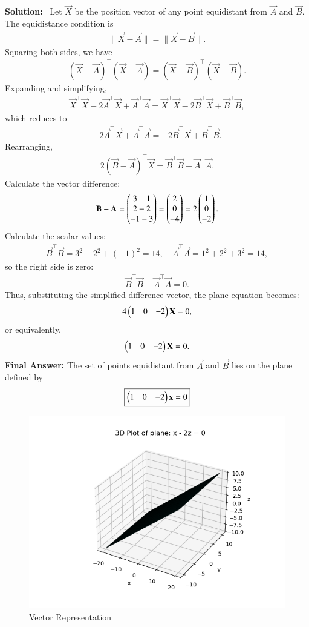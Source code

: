 \documentclass[journal]{IEEEtran}
\begin{document}
\textbf{Solution:} \
Let \(\vec{X}\) be the position vector of any point equidistant from \(\vec{A}\) and \(\vec{B}\).
The equidistance condition is
\begin{align}
\|\vec{X} - \vec{A}\| = \|\vec{X} - \vec{B}\|.
\end{align}
Squaring both sides, we have
\begin{align}
(\vec{X} - \vec{A})^\top (\vec{X} - \vec{A}) = (\vec{X} - \vec{B})^\top (\vec{X} - \vec{B}).
\end{align}
Expanding and simplifying,
\begin{align}
\vec{X}^\top \vec{X} - 2 \vec{A}^\top \vec{X} + \vec{A}^\top \vec{A} = \vec{X}^\top \vec{X} - 2 \vec{B}^\top \vec{X} + \vec{B}^\top \vec{B},
\end{align}
which reduces to
\begin{align}
-2 \vec{A}^\top \vec{X} + \vec{A}^\top \vec{A} = -2 \vec{B}^\top \vec{X} + \vec{B}^\top \vec{B}.
\end{align}
Rearranging,
\begin{align}
2 (\vec{B} - \vec{A})^\top \vec{X} = \vec{B}^\top \vec{B} - \vec{A}^\top \vec{A}.
\end{align}
Calculate the vector difference:
\begin{align}
\mathbf{B} - \mathbf{A} = \begin{pmatrix}3 - 1 \\ 2 - 2 \\ -1 - 3\end{pmatrix} = \begin{pmatrix}2 \\ 0 \\ -4\end{pmatrix} = 2 \begin{pmatrix}1 \\ 0 \\ -2\end{pmatrix}.
\end{align}
Calculate the scalar values:
\begin{align}
\vec{B}^\top \vec{B} = 3^2 + 2^2 + (-1)^2 = 14, \quad \vec{A}^\top \vec{A} = 1^2 + 2^2 + 3^2 = 14,
\end{align}
so the right side is zero:
\begin{align}
\vec{B}^\top \vec{B} - \vec{A}^\top \vec{A} = 0.
\end{align}
Thus, substituting the simplified difference vector, the plane equation becomes:
\begin{align}
4\begin{pmatrix}1 & 0 & -2\end{pmatrix}\mathbf{X} = 0,
\end{align}
or equivalently,
\begin{align}
\begin{pmatrix}1 & 0 & -2\end{pmatrix}\mathbf{X} = 0.
\end{align}
\textbf{Final Answer:} The set of points equidistant from \(\vec{A}\) and \(\vec{B}\) lies on the plane defined by
\[
\boxed{
\begin{pmatrix}1 & 0 & -2\end{pmatrix} \mathbf{x} = 0
}
\]


\begin{figure}[htbp]
    \centering
    \includegraphics[width=0.65\linewidth]{FIG/fig1.png}
    \caption{Vector Representation}
    \label{fig:FIG/fig1.png}
    \end{figure}
\end{document}
